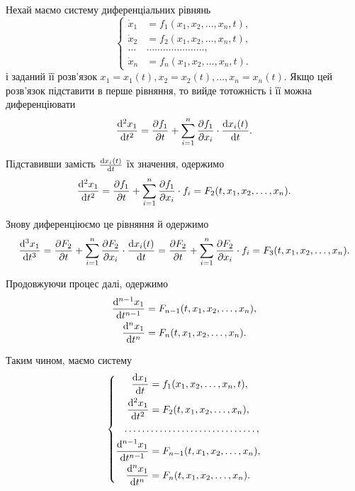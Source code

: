 Нехай маємо систему диференціальних рівнянь
\begin{equation*}
	\left\{
		\begin{aligned}
			\dot x_1 &= f_1 (x_1, x_2, \ldots, x_n, t), \\
			\dot x_2 &= f_2 (x_1, x_2, \ldots, x_n, t), \\
			\ldots & \ldots \ldots \ldots \ldots \ldots \ldots \ldots, \\
			\dot x_n &= f_n (x_1, x_2, \ldots, x_n, t).
		\end{aligned}
	\right.
\end{equation*}
і заданий її розв'язок $x_1 = x_1(t), x_2 = x_2(t), \ldots, x_n = x_n(t)$. Якщо цей розв'язок підставити в перше рівняння, то вийде тотожність і її можна диференціювати
\begin{equation*}
	\frac{\mathop{}\!\mathrm{d}^2 x_1}{\mathop{}\!\mathrm{d} t^2} = \frac{\partial f_1}{\partial t} + \sum_{i = 1}^n \frac{\partial f_1}{\partial x_i} \cdot \frac{\mathop{}\!\mathrm{d} x_i(t)}{\mathop{}\!\mathrm{d} t}.
\end{equation*}

Підставивши замість $\frac{\mathop{}\!\mathrm{d} x_i(t)}{\mathop{}\!\mathrm{d} t}$ їх значення, одержимо
\begin{equation*}
	\frac{\mathop{}\!\mathrm{d}^2 x_1}{\mathop{}\!\mathrm{d} t^2} = \frac{\partial f_1}{\partial t} + \sum_{i = 1}^n \frac{\partial f_1}{\partial x_i} \cdot f_i = F_2(t, x_1, x_2, \ldots, x_n).
\end{equation*}

Знову диференціюємо це рівняння й одержимо
\begin{equation*}
	\frac{\mathop{}\!\mathrm{d}^3 x_1}{\mathop{}\!\mathrm{d} t^3} = \frac{\partial F_2}{\partial t} + \sum_{i = 1}^n \frac{\partial F_2}{\partial x_i} \cdot \frac{\mathop{}\!\mathrm{d} x_i(t)}{\mathop{}\!\mathrm{d} t} = \frac{\partial F_2}{\partial t} + \sum_{i = 1}^n \frac{\partial F_2}{\partial x_i} \cdot f_i = F_3(t, x_1, x_2, \ldots, x_n).
\end{equation*}

Продовжуючи процес далі, одержимо
\begin{align*}
	\frac{\mathop{}\!\mathrm{d}^{n - 1} x_1}{\mathop{}\!\mathrm{d} t^{n - 1}} &= F_{n - 1}(t, x_1, x_2, \ldots, x_n), \\
	\frac{\mathop{}\!\mathrm{d}^n x_1}{\mathop{}\!\mathrm{d} t^n} &= F_n(t, x_1, x_2, \ldots, x_n).
\end{align*} 
 
Таким чином, маємо систему
\begin{equation*}
	\left\{
		\begin{aligned}
			\frac{\diff x_1}{\diff t} &= f_1 (x_1, x_2, \ldots, x_n, t), \\
			\frac{\diff^2 x_1}{\diff t^2} &= F_2(t, x_1, x_2, \ldots, x_n), \\
			\ldots \ldots & \ldots \ldots \ldots \ldots \ldots \ldots \ldots \ldots, \\
			\frac{\diff^{n - 1} x_1}{\diff t^{n - 1}} &= F_{n - 1}(t, x_1, x_2, \ldots, x_n), \\
			\frac{\diff^n x_1}{\diff t^n} &= F_n(t, x_1, x_2, \ldots, x_n).
		\end{aligned}
	\right.
\end{equation*}

